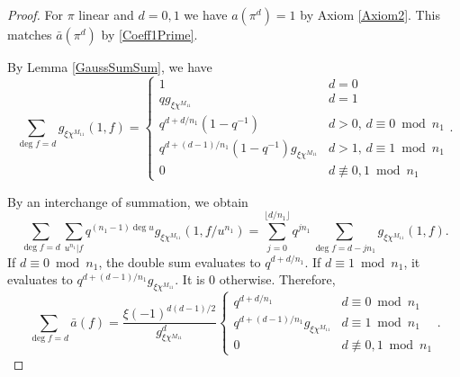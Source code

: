 \documentclass[11pt,letterpaper]{article}
\theoremstyle{definition}
\theoremstyle{remark}
\numberwithin{equation}{section}
\theoremstyle{dotless}
\begin{document}
\begin{proof}
For $\pi$ linear and $d=0,1$ we have $a(\pi^d)=1$ by Axiom \ref{Axiom2}. This matches $\bar{a}(\pi^d)$ by \eqref{Coeff1Prime}.

By Lemma \ref{GaussSumSum}, we have
\begin{equation}
\sum_{\deg f = d} g_{\xi \chi^{M_{11}}} (1, f) = \left\lbrace \begin{array}{cc} 
1 & d=0 \\
qg_{\xi \chi^{M_{11}}} & d = 1 \\
q^{d+d/n_1}(1-q^{-1}) & d>0, \, d \equiv 0 \bmod n_1  \\
q^{d+(d-1)/n_1}(1-q^{-1}) g_{\xi \chi^{M_{11}}}  & d>1, \, d \equiv 1 \bmod n_1  \\
0 & d \not \equiv 0, 1 \bmod n_1
\end{array} \right. .
\end{equation}

By an interchange of summation, we obtain
\begin{equation*}
\sum_{\deg f = d} \sum_{u^{n_1}|f} q^{(n_1-1)\deg u} g_{\xi \chi^{M_{11}}}(1, f/u^{n_1}) = \sum_{j=0}^{\lfloor d/{n_1} \rfloor} q^{j n_1 } \sum_{\deg f = d-j n_1} g_{\xi \chi^{M_{11}}}(1, f).
\end{equation*}
If $d \equiv 0 \bmod n_1$, the double sum evaluates to $q^{d+d/n_1}$. If $d \equiv 1 \bmod n_1$, it evaluates to $q^{d+(d-1)/n_1}g_{\xi \chi^{M_{11}}}$. It is $0$ otherwise. Therefore,
\begin{equation*}
\sum_{\deg f = d} \bar{a}(f)=\frac{\xi(-1)^{d(d-1)/2}}{g_{\xi \chi^{M_{11}}}^d} \left\lbrace \begin{array}{cc} 
q^{d+d/n_1} & d \equiv 0 \bmod n_1 \\
q^{d+(d-1)/n_1}g_{\xi \chi^{M_{11}}} & d \equiv 1 \bmod n_1 \\
0 & d \not \equiv 0, 1 \bmod n_1
\end{array} \right. .
\end{equation*}


\end{proof}
\end{document}
